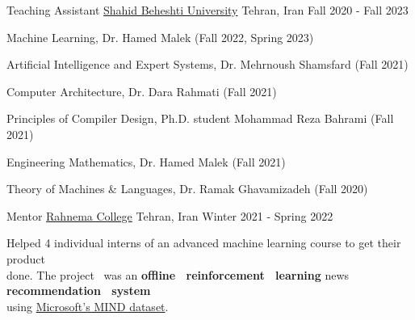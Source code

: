 

\begin{cventries}

  \cventry%
    {Teaching Assistant} %
    {\href{https://en.sbu.ac.ir/}{Shahid Beheshti University}} %
    {Tehran, Iran} %
    {Fall 2020 - Fall 2023} %
    {%
      \begin{cvitems} %
        \item {Machine Learning, Dr. Hamed Malek (Fall 2022, Spring 2023)}
        \item {Artificial Intelligence and Expert Systems, Dr. Mehrnoush Shamsfard (Fall 2021)}
        \item {Computer Architecture, Dr. Dara Rahmati (Fall 2021)}
        \item {Principles of Compiler Design, Ph.D. student Mohammad Reza Bahrami (Fall 2021)}
        \item {Engineering Mathematics, Dr. Hamed Malek (Fall 2021)}
        \item {Theory of Machines \& Languages, Dr. Ramak Ghavamizadeh (Fall 2020)}
      \end{cvitems}
    }


  \cventry%
    {Mentor} %
    {\href{https://rahnemacollege.com/}{Rahnema College}} %
    {Tehran, Iran} %
    {Winter 2021 - Spring 2022} %
    {%
      \begin{cvitems} %
        \item {Helped 4 individual interns of an advanced machine learning course to get their product \\done. The project \ was an {\textbf{offline \ reinforcement \ learning}} news {\textbf{recommendation \ system}} \\using \href{https://msnews.github.io/}{Microsoft's MIND dataset}.}
      \end{cvitems}
    }


\end{cventries}
